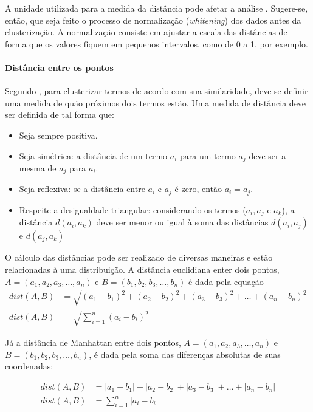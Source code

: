 A unidade utilizada para a medida da distância pode afetar a análise \cite{cole1998}. Sugere-se, então, que seja feito o processo de normalização (\textit{whitening}) dos dados antes da clusterização. A normalização consiste em ajustar a escala das distâncias de forma que os valores fiquem em pequenos intervalos, como de 0 a 1, por exemplo.


\paragraph{Distância entre os pontos}
\label{ssub:distância_entre_os_pontos}

Segundo , para clusterizar termos de acordo com sua similaridade, deve-se definir uma medida de quão próximos dois termos estão. Uma medida de distância deve ser definida de tal forma que:

\begin{itemize}
  \item Seja sempre positiva.
  \item Seja simétrica: a distância de um termo \(a_i\) para um termo \(a_j\) deve ser a mesma de \(a_j\) para \(a_i\).
  \item Seja reflexiva: se a distância entre \(a_i\) e \(a_j\) é zero, então \(a_i = a_j\).
  \item Respeite a desigualdade triangular: considerando os termos (\(a_i, a_j\) e \(a_k\)), a distância \(d(a_i, a_k)\) deve ser menor ou igual à soma das distâncias \(d(a_i, a_j)\) e \(d(a_j, a_k)\)
\end{itemize}

O cálculo das distâncias pode ser realizado de diversas maneiras e estão relacionadas à uma distribuição. A distância euclidiana enter dois pontos,  \(A=(a_1, a_2, a_3, \ldots, a_n) \) e \(B=(b_1, b_2, b_3, \ldots, b_n) \) é dada pela equação
%
\begin{align}
  dist(A, B) &= \sqrt{(a_1-b_1)^2+(a_2-b_2)^2+(a_3-b_3)^2+\ldots+(a_n-b_n)^2} \\
  dist(A, B) &= \sqrt{\displaystyle\sum_{i=1}^{n} (a_i-b_i)^2} \label{eq:euclidean}
\end{align}

Já a distância de Manhattan entre dois pontos, \(A=(a_1, a_2, a_3, \ldots, a_n) \) e \(B=(b_1, b_2, b_3, \ldots, b_n) \), é dada pela soma das diferenças absolutas de suas coordenadas:

\begin{align}
  dist(A, B) &= |a_1-b_1|+|a_2-b_2|+|a_3-b_3|+\ldots+|a_n-b_n| \\
  dist(A, B) &= \displaystyle\sum_{i=1}^{n} |a_i-b_i| \label{eq:manhattan}
\end{align}

